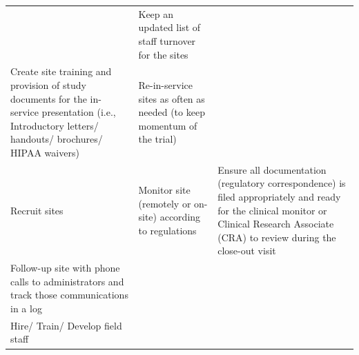 \documentclass[]{book}
\theoremstyle{definition}
\theoremstyle{definition}
\theoremstyle{definition}
\theoremstyle{remark}
\begin{document}
\begin{longtable}[]{@{}lll@{}}
\begin{minipage}[t]{0.27\columnwidth}
\end{minipage} & \begin{minipage}[t]{0.33\columnwidth}\raggedright\strut
Keep an updated list of staff turnover for the sites\strut
\end{minipage} & \begin{minipage}[t]{0.30\columnwidth}\raggedright\strut
\strut
\end{minipage}\tabularnewline
\begin{minipage}[t]{0.27\columnwidth}\raggedright\strut
Create site training and provision of study documents for the in-service
presentation (i.e., Introductory letters/ handouts/ brochures/ HIPAA
waivers)\strut
\end{minipage} & \begin{minipage}[t]{0.33\columnwidth}\raggedright\strut
Re-in-service sites as often as needed (to keep momentum of the
trial)\strut
\end{minipage} & \begin{minipage}[t]{0.30\columnwidth}\raggedright\strut
\strut
\end{minipage}\tabularnewline
\begin{minipage}[t]{0.27\columnwidth}\raggedright\strut
Recruit sites\strut
\end{minipage} & \begin{minipage}[t]{0.33\columnwidth}\raggedright\strut
Monitor site (remotely or on-site) according to regulations\strut
\end{minipage} & \begin{minipage}[t]{0.30\columnwidth}\raggedright\strut
Ensure all documentation (regulatory correspondence) is filed
appropriately and ready for the clinical monitor or Clinical Research
Associate (CRA) to review during the close-out visit\strut
\end{minipage}\tabularnewline
\begin{minipage}[t]{0.27\columnwidth}\raggedright\strut
Follow-up site with phone calls to administrators and track those
communications in a log\strut
\end{minipage} & \begin{minipage}[t]{0.33\columnwidth}\raggedright\strut
\strut
\end{minipage} & \begin{minipage}[t]{0.30\columnwidth}\raggedright\strut
\strut
\end{minipage}\tabularnewline
\begin{minipage}[t]{0.27\columnwidth}\raggedright\strut
Hire/ Train/ Develop field staff\strut

\end{minipage}
\end{longtable}
\end{document}
